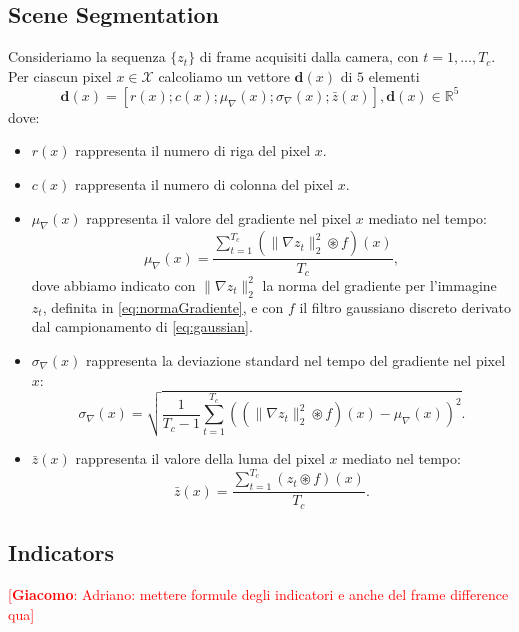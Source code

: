 \documentclass{llncs}
\newcommand{\gi}[1]{{\textcolor{red}{[\small \textbf{Giacomo}: #1]}}}
\begin{document}
\subsection{Scene Segmentation}\label{subsec:Segmentation}
Consideriamo la sequenza $\{z_t\}$ di frame acquisiti dalla camera, con $t=1,\dots,T_{c}$.
Per ciascun pixel $x\in\mathcal{X}$ calcoliamo un vettore $\textbf{d}(x)$ di $5$ elementi
\begin{equation}
\label{eq:featureVector}
\textbf{d}(x)=\left[r(x);c(x);\mu_{\nabla}(x);\sigma_{\nabla}(x);\bar{z}(x)\right], \textbf{d}(x) \in \mathbb{R}^5
\end{equation}
dove:
\begin{itemize}
	\item $r(x)$ rappresenta il numero di riga del pixel $x$.
	\item $c(x)$ rappresenta il numero di colonna del pixel $x$.
	\item $\mu_{\nabla}(x)$ rappresenta il valore del gradiente nel pixel $x$ mediato nel tempo:
	\begin{equation}
	\label{eq:segmentazioneGrad}
	\mu_{\nabla}(x) = \frac{\sum_{t=1}^{T_c}(\|\nabla z_t\|_2^2 \circledast f)(x)}{T_c},
	\end{equation}
	dove abbiamo indicato con $\|\nabla z_t\|_2^2$ la norma del gradiente per l'immagine $z_t$, definita in \eqref{eq:normaGradiente}, e con $f$ il filtro gaussiano discreto derivato dal campionamento di \eqref{eq:gaussian}.
	\item $\sigma_{\nabla}(x)$ rappresenta la deviazione standard nel tempo del gradiente nel pixel $x$:
	\begin{equation}
	\label{eq:segmentazioneVar}
	\sigma_{\nabla}(x)=\sqrt{\frac{1}{T_c - 1}\sum_{t=1}^{T_c}\left(\left(\|\nabla z_t\|_2^2 \circledast f\right)(x)-\mu_{\nabla}(x)\right)^2}.
	\end{equation}
	\item $\bar{z}(x)$ rappresenta il valore della luma del pixel $x$ mediato nel tempo:
	\begin{equation}
	\label{eq:segmentazioneLuma}
	\bar{z}(x)=\frac{\sum_{t=1}^{T_c}( z_t \circledast f)(x)}{T_c}.
	\end{equation}
\end{itemize}
\subsection{Indicators}\label{subsec:Indicators}
\gi{Adriano: mettere formule degli indicatori e anche del frame difference qua}
\end{document}
